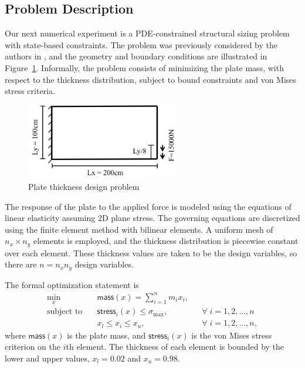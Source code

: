\subsection{Problem Description}
Our next numerical experiment is a PDE-constrained structural sizing problem
with state-based constraints.  The problem was previously considered by the
authors in \cite{dener:scitech2016}, and the geometry and boundary conditions
are illustrated in Figure~\ref{fig:struct}.  Informally, the problem consists of
minimizing the plate mass, with respect to the thickness distribution, subject
to bound constraints and von Mises stress criteria. 
\begin{figure}[tbp]
  \centering
  \includegraphics[width=0.6\textwidth]{./figs/chap6_fstopo/struct.png}
  \caption{Plate thickness design problem}
  \label{fig:struct}
\end{figure}

The response of the plate to the applied force is modeled using the equations of
linear elasticity assuming 2D plane stress.  The governing equations are
discretized using the finite element method with bilinear elements.
A uniform mesh of $n_x \times n_y$ elements is employed, and the thickness
distribution is piecewise constant over each element.  These thickness values
are taken to be the design variables, so there are $n = n_x n_y$ design
variables.

The formal optimization statement is
\begin{equation*}
  \begin{alignedat}{2}
    \underset{x}{\text{min}} \quad &\textsf{mass}(x) = \sum_{i=1}^{n} m_i x_i, & &\\
    \text{subject to} \quad &\textsf{stress}_i(x) \leq \sigma_{\max}, &
    &\forall\; i = 1,2,\ldots,n \\
      & x_l \leq x_i \leq  x_u, \qquad & &\forall\; i = 1,2,\ldots,n,
  \end{alignedat}
\end{equation*}
where $\textsf{mass}(x)$ is the plate mass, and $\textsf{stress}_{i}(x)$ is the
von Mises stress criterion on the $i$th element. The thickness of each element
is bounded by the lower and upper values, $x_l = 0.02$ and $x_u = 0.98$. 

